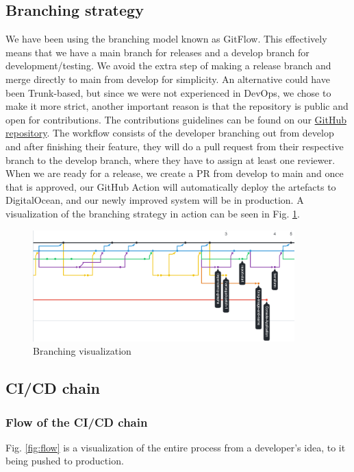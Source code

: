 \documentclass[10pt]{article}
\begin{document}
\subsection{Branching strategy}
We have been using the branching model known as GitFlow. This effectively means that we have a main branch for releases and a develop branch for development/testing. We avoid the extra step of making a release branch and merge directly to main from develop for simplicity. An alternative could have been Trunk-based, but since we were not experienced in DevOps, we chose to make it more strict, another important reason is that the repository is public and open for contributions. The contributions guidelines can be found on our \href{https://github.com/Arklaide/devopsITUproject/blob/main/contributing.md}{GitHub repository}. The workflow consists of the developer branching out from develop and after finishing their feature, they will do a pull request from their respective branch to the develop branch, where they have to assign at least one reviewer. When we are ready for a release, we create a PR from develop to main and once that is approved, our GitHub Action will automatically deploy the artefacts to DigitalOcean, and our newly improved system will be in production. A visualization of the branching strategy in action can be seen in Fig. \ref{fig:branch}.

\begin{figure} [H]
  \centering
  \includegraphics[width=0.9\textwidth]{images/branch.png}
  \caption{Branching visualization}
  \label{fig:branch}
\end{figure}

\subsection{CI/CD chain}
\subsubsection{Flow of the CI/CD chain}
\label{cicdchain}
Fig. \ref{fig:flow} is a visualization of the entire process from a developer's idea, to it being pushed to production.
\end{document}
